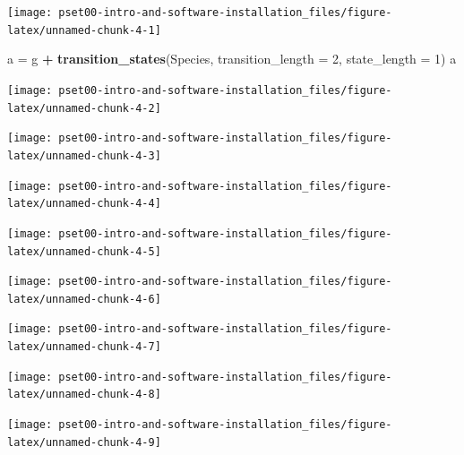 \documentclass[
]{article}
\newenvironment{Shaded}{\begin{snugshade}}{\end{snugshade}}
\newcommand{\AttributeTok}[1]{\textcolor[rgb]{0.13,0.29,0.53}{#1}}
\newcommand{\DecValTok}[1]{\textcolor[rgb]{0.00,0.00,0.81}{#1}}
\newcommand{\FunctionTok}[1]{\textcolor[rgb]{0.13,0.29,0.53}{\textbf{#1}}}
\newcommand{\NormalTok}[1]{#1}
\newcommand{\OtherTok}[1]{\textcolor[rgb]{0.56,0.35,0.01}{#1}}
\newcommand{\SpecialCharTok}[1]{\textcolor[rgb]{0.81,0.36,0.00}{\textbf{#1}}}
\begin{document}
\begin{center}\texttt{[image: pset00-intro-and-software-installation\_files/figure-latex/unnamed-chunk-4-1]} \end{center}

\begin{Shaded}
\begin{Highlighting}[]
\NormalTok{a }\OtherTok{=}\NormalTok{ g }\SpecialCharTok{+} 
  \FunctionTok{transition\_states}\NormalTok{(Species,}
                    \AttributeTok{transition\_length =} \DecValTok{2}\NormalTok{,}
                    \AttributeTok{state\_length =} \DecValTok{1}\NormalTok{)}
\NormalTok{a}
\end{Highlighting}
\end{Shaded}

\begin{center}\texttt{[image: pset00-intro-and-software-installation\_files/figure-latex/unnamed-chunk-4-2]} \end{center}

\begin{center}\texttt{[image: pset00-intro-and-software-installation\_files/figure-latex/unnamed-chunk-4-3]} \end{center}

\begin{center}\texttt{[image: pset00-intro-and-software-installation\_files/figure-latex/unnamed-chunk-4-4]} \end{center}

\begin{center}\texttt{[image: pset00-intro-and-software-installation\_files/figure-latex/unnamed-chunk-4-5]} \end{center}

\begin{center}\texttt{[image: pset00-intro-and-software-installation\_files/figure-latex/unnamed-chunk-4-6]} \end{center}

\begin{center}\texttt{[image: pset00-intro-and-software-installation\_files/figure-latex/unnamed-chunk-4-7]} \end{center}

\begin{center}\texttt{[image: pset00-intro-and-software-installation\_files/figure-latex/unnamed-chunk-4-8]} \end{center}

\begin{center}\texttt{[image: pset00-intro-and-software-installation\_files/figure-latex/unnamed-chunk-4-9]} \end{center}
\end{document}
